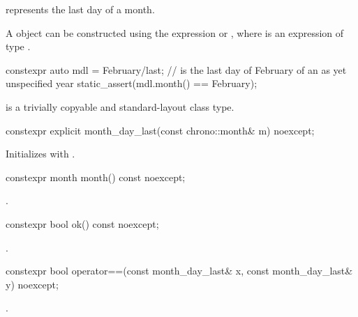 \pnum
{} represents the last day of a month.

\pnum
\begin{note}
A  object
can be constructed using the expression  or ,
where  is an expression of type .
\end{note}
\begin{example}
\begin{codeblock}
constexpr auto mdl = February/last;     //  is the last day of February of an as yet unspecified year
static_assert(mdl.month() == February);
\end{codeblock}
\end{example}

\pnum
{} is a trivially copyable and standard-layout class type.

%
\begin{itemdecl}
constexpr explicit month_day_last(const chrono::month& m) noexcept;
\end{itemdecl}

\begin{itemdescr}
\pnum
\effects
Initializes  with .
\end{itemdescr}

%
\begin{itemdecl}
constexpr month month() const noexcept;
\end{itemdecl}

\begin{itemdescr}
\pnum
\returns
{}.
\end{itemdescr}

%
\begin{itemdecl}
constexpr bool ok() const noexcept;
\end{itemdecl}

\begin{itemdescr}
\pnum
\returns
{}.
\end{itemdescr}

%
\begin{itemdecl}
constexpr bool operator==(const month_day_last& x, const month_day_last& y) noexcept;
\end{itemdecl}

\begin{itemdescr}
\pnum
\returns
{}.
\end{itemdescr}

